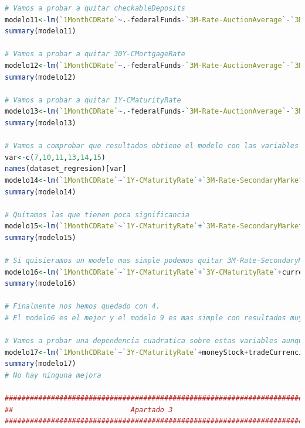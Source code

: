 \documentclass[12pt,a4paper]{article}
\begin{document}
\begin{lstlisting}[basicstyle=\tiny, language=R]
# Vamos a probar a quitar checkableDeposits
modelo11<-lm(`1MonthCDRate`~.-federalFunds-`3M-Rate-AuctionAverage`-`3M-Rate-SecondaryMarket`-`5Y-CMaturityRate`-demandDeposits-bankCredit-savingsDeposits-currency-loansLeases-checkableDeposits, dataset_regresion)
summary(modelo11)

# Vamos a probar a quitar 30Y-CMortgageRate
modelo12<-lm(`1MonthCDRate`~.-federalFunds-`3M-Rate-AuctionAverage`-`3M-Rate-SecondaryMarket`-`5Y-CMaturityRate`-demandDeposits-bankCredit-savingsDeposits-currency-loansLeases-checkableDeposits-`30Y-CMortgageRate`, dataset_regresion)
summary(modelo12)

# Vamos a probar a quitar 1Y-CMaturityRate
modelo13<-lm(`1MonthCDRate`~.-federalFunds-`3M-Rate-AuctionAverage`-`3M-Rate-SecondaryMarket`-`5Y-CMaturityRate`-demandDeposits-bankCredit-savingsDeposits-currency-loansLeases-checkableDeposits-`30Y-CMortgageRate`-`1Y-CMaturityRate`, dataset_regresion)
summary(modelo13)

# Vamos a comprobar que resultados obtiene el modelo con las variables que decidimos quedarnos en el EDA
var<-c(7,10,11,13,14,15)
names(dataset_regresion)[var]
modelo14<-lm(`1MonthCDRate`~`1Y-CMaturityRate`+`3M-Rate-SecondaryMarket`+`3Y-CMaturityRate`+currency+federalFunds+savingsDeposits+tradeCurrencies, dataset_regresion)
summary(modelo14)

# Quitamos las que tienen poca significancia
modelo15<-lm(`1MonthCDRate`~`1Y-CMaturityRate`+`3M-Rate-SecondaryMarket`+`3Y-CMaturityRate`+currency+savingsDeposits, dataset_regresion)
summary(modelo15)

# Si quisieramos un modelo mas simple podemos quitar 3M-Rate-SecondaryMarket
modelo16<-lm(`1MonthCDRate`~`1Y-CMaturityRate`+`3Y-CMaturityRate`+currency+savingsDeposits, dataset_regresion)
summary(modelo16)

# Finalmente nos hemos quedado con 4.
# El modelo6 es el mejor y el modelo 9 es mas simple con resultados muy parecidos. Merece la pena el ultimo.

# Vamos a probar una dependencia cuadratica sobre estas variables aunque el resultado ya es lo suficientemente bueno.
modelo17<-lm(`1MonthCDRate`~`3Y-CMaturityRate`+moneyStock+tradeCurrencies+`3Y-CMaturityRate`*`3Y-CMaturityRate`+moneyStock*moneyStock+tradeCurrencies*tradeCurrencies+`3Y-CMaturityRate`*moneyStock+`3Y-CMaturityRate`*tradeCurrencies+moneyStock*tradeCurrencies, dataset_regresion)
summary(modelo17)
# No hay ninguna mejora

###########################################################################
##                            Apartado 3                                 ##
###########################################################################


\end{lstlisting}
\end{document}
